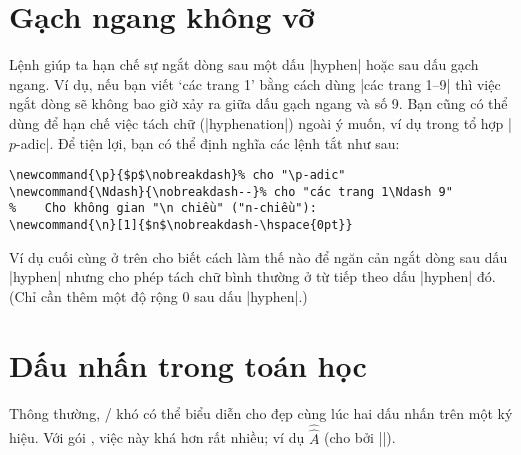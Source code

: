 \documentclass[11pt,leqno,titlepage,openany,oneside]{amsldoc}[1999/12/13]
\begin{document}
\section{Gạch ngang không vỡ}

Lệnh  giúp ta hạn chế sự ngắt dòng sau một dấu |hyphen|
hoặc sau dấu gạch ngang.
Ví dụ, nếu bạn viết `các trang 1' bằng cách dùng |các trang 1\nobreakdash--9|
thì việc ngắt dòng sẽ không bao giờ xảy ra giữa dấu gạch ngang và số 9.
Bạn cũng có thể dùng  để hạn chế việc tách chữ (|hyphenation|)
ngoài ý muốn, ví dụ trong tổ hợp |$p$-adic|. Để tiện lợi, bạn có thể định
nghĩa các lệnh tắt như sau:

\medskip
\begin{verbatim}
\newcommand{\p}{$p$\nobreakdash}% cho "\p-adic"
\newcommand{\Ndash}{\nobreakdash--}% cho "các trang 1\Ndash 9"
%    Cho không gian "\n chiều" ("n-chiều"):
\newcommand{\n}[1]{$n$\nobreakdash-\hspace{0pt}}
\end{verbatim}

\medskip
Ví dụ cuối cùng ở trên cho biết cách làm thế nào để ngăn cản ngắt dòng sau dấu
|hyphen| nhưng cho phép tách chữ bình thường ở từ tiếp theo dấu |hyphen| đó.
(Chỉ cần thêm một độ rộng 0 sau dấu |hyphen|.)

\section{Dấu nhấn trong toán học}

Thông thường, \latex/ khó có thể biểu diễn cho đẹp cùng lúc hai dấu nhấn
trên một ký hiệu. Với gói , việc này khá hơn rất nhiều; ví dụ
$\hat{\hat{A}}$ (cho bởi |{}|).
\end{document}
